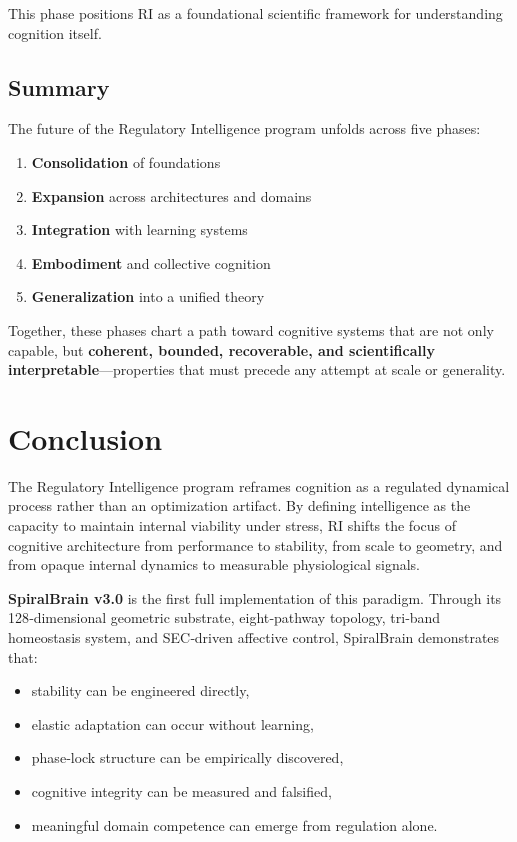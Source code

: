 \documentclass[12pt,a4paper]{report}
\begin{document}
This phase positions RI as a foundational scientific framework for understanding cognition itself.

\subsection{Summary}

The future of the Regulatory Intelligence program unfolds across five phases:

\begin{enumerate}
\item \textbf{Consolidation} of foundations  
\item \textbf{Expansion} across architectures and domains  
\item \textbf{Integration} with learning systems  
\item \textbf{Embodiment} and collective cognition  
\item \textbf{Generalization} into a unified theory  
\end{enumerate}

Together, these phases chart a path toward cognitive systems that are not only capable, but \textbf{coherent, bounded, recoverable, and scientifically interpretable}—properties that must precede any attempt at scale or generality.

\section{Conclusion}

The Regulatory Intelligence program reframes cognition as a regulated dynamical process rather than an optimization artifact. By defining intelligence as the capacity to maintain internal viability under stress, RI shifts the focus of cognitive architecture from performance to stability, from scale to geometry, and from opaque internal dynamics to measurable physiological signals.

\textbf{SpiralBrain v3.0} \cite{SpiralBrainV3} is the first full implementation of this paradigm. Through its 128‑dimensional geometric substrate, eight‑pathway topology, tri‑band homeostasis system, and SEC‑driven affective control, SpiralBrain demonstrates that:

\begin{itemize}
    \item stability can be engineered directly,
    \item elastic adaptation can occur without learning,
    \item phase‑lock structure can be empirically discovered,
    \item cognitive integrity can be measured and falsified,
    \item meaningful domain competence can emerge from regulation alone.
\end{itemize}
\end{document}
